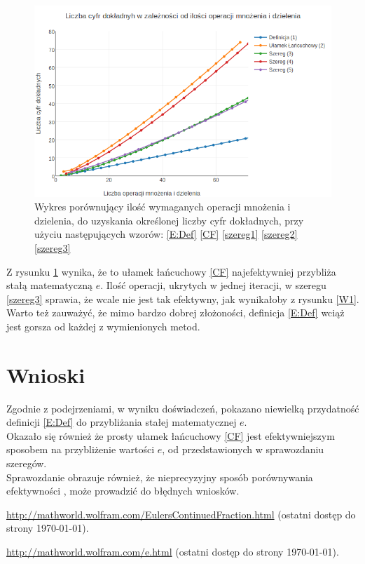 \documentclass{article}
\begin{document}
\begin{figure}[h]
	\centering
	\includegraphics[width= 1 \textwidth]{wykres2.png}
	\caption{Wykres porównujący ilość wymaganych operacji mnożenia i dzielenia, do uzyskania określonej liczby cyfr dokładnych, przy użyciu następujących wzorów: \eqref{E:Def} \eqref{CF} \eqref{szereg1} \eqref{szereg2} \eqref{szereg3}}
	\label{W2}
\end{figure}

Z rysunku \ref{W2} wynika, że to ułamek łańcuchowy \eqref{CF} najefektywniej przybliża stałą matematyczną $e$. Ilość operacji, ukrytych w jednej iteracji, w szeregu \eqref{szereg3} sprawia, że wcale nie jest tak efektywny, jak wynikałoby z rysunku \ref{W1}. Warto też zauważyć, że mimo bardzo dobrej złożoności, definicja \eqref{E:Def} wciąż jest gorsza od każdej z wymienionych metod.

\section{Wnioski}


\indent
Zgodnie z podejrzeniami, w wyniku doświadczeń, pokazano niewielką przydatność definicji \eqref{E:Def} do przybliżania stałej matematycznej $e$.
\\ \indent
 Okazało się również że prosty ułamek łańcuchowy \eqref{CF} jest efektywniejszym sposobem na przybliżenie wartości $e$, od przedstawionych w sprawozdaniu szeregów. \\\indent
Sprawozdanie obrazuje również, że nieprecyzyjny sposób porównywania efektywności , może prowadzić do błędnych wniosków.


\begin{thebibliography}{9}
	\itemsep2pt
	 \url{http://mathworld.wolfram.com/EulersContinuedFraction.html}
	(ostatni dostęp do strony \today).
	
	 \url{http://mathworld.wolfram.com/e.html}
	(ostatni dostęp do strony \today).
		
\end{thebibliography}
\end{document}
